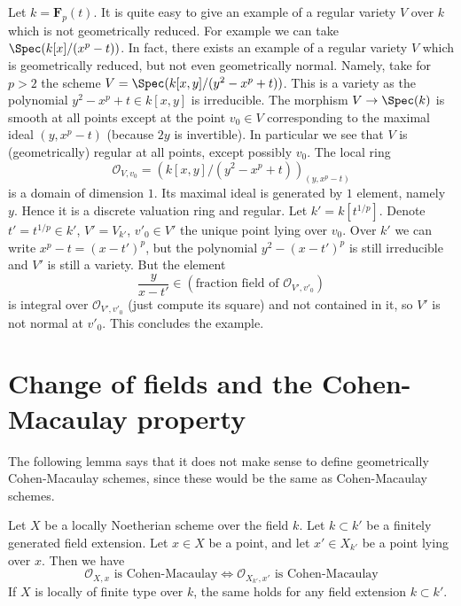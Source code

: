\begin{example}
\label{example-geometrically-reduced-not-normal}
Let $k =\mathbf{F}_p(t)$. It is quite easy to give an example of a regular
variety $V$ over $k$ which is not geometrically reduced. For example we
can take $\Spec(k[x]/(x^p - t))$. In fact, there exists an
example of a regular variety $V$ which is geometrically reduced, but
not even geometrically normal. Namely, take for $p > 2$ the scheme
$V = \Spec(k[x, y]/(y^2 - x^p + t))$. This is a variety as the
polynomial $y^2 - x^p + t \in k[x, y]$ is irreducible.
The morphism $V \to \Spec(k)$ is smooth at all points
except at the point $v_0 \in V$ corresponding to the maximal ideal
$(y, x^p - t)$ (because $2y$ is invertible). In particular we see that
$V$ is (geometrically) regular at all points, except possibly $v_0$.
The local ring
$$
\mathcal{O}_{V, v_0} = \left(k[x, y]/(y^2 - x^p + t)\right)_{(y, x^p - t)}
$$
is a domain of dimension $1$. Its maximal ideal is generated by $1$ element,
namely $y$. Hence it is a discrete valuation ring and regular.
Let $k' = k[t^{1/p}]$. Denote $t' = t^{1/p} \in k'$,
$V' = V_{k'}$, $v'_0 \in V'$ the unique point lying over $v_0$.
Over $k'$ we can write $x^p - t = (x - t')^p$, but the polynomial
$y^2 - (x - t')^p$ is still irreducible and $V'$ is still a variety.
But the element
$$
\frac{y}{x - t'} \in (\text{fraction field of }\mathcal{O}_{V', v'_0})
$$
is integral over $\mathcal{O}_{V', v'_0}$ (just compute its square)
and not contained in it, so $V'$ is not normal at $v'_0$. This concludes
the example.
\end{example}







\section{Change of fields and the Cohen-Macaulay property}
\label{section-CM}

\noindent
The following lemma says that it does not make sense to define
geometrically Cohen-Macaulay schemes, since these would be the
same as Cohen-Macaulay schemes.

\begin{lemma}
\label{lemma-CM-base-change}
Let $X$ be a locally Noetherian scheme over the field $k$.
Let $k \subset k'$ be a finitely generated field extension.
Let $x \in X$ be a point, and let $x' \in X_{k'}$ be a point lying
over $x$. Then we have
$$
\mathcal{O}_{X, x}\text{ is Cohen-Macaulay}
\Leftrightarrow
\mathcal{O}_{X_{k'}, x'}\text{ is Cohen-Macaulay}
$$
If $X$ is locally of finite type over $k$, the same holds for any
field extension $k \subset k'$.
\end{lemma}

